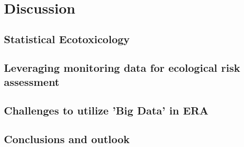 \chapter{Discussion}
\label{sec:discussion} 
 
\section{Statistical Ecotoxicology}




\section{Leveraging monitoring data for ecological risk assessment}



\section{Challenges to utilize 'Big Data' in ERA}

\section{Conclusions and outlook}


